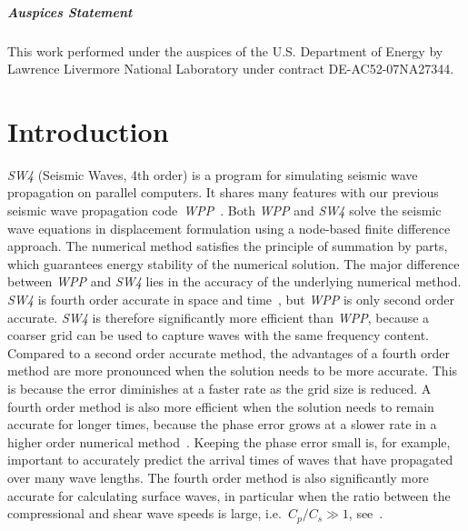 \documentclass[11pt]{report}
\begin{document}
\paragraph{Auspices Statement}
This work performed under the auspices of the U.S. Department of Energy by Lawrence Livermore
National Laboratory under contract DE-AC52-07NA27344.
\tableofcontents


\chapter{Introduction}


\emph{SW4} (Seismic Waves, 4th order) is a program for simulating seismic wave propagation on
parallel computers. It shares many features with our previous seismic wave propagation
code~\emph{WPP}~\cite{WPP2}. Both \emph{WPP} and \emph{SW4} solve the seismic wave equations in
displacement formulation using a node-based finite difference approach. The numerical method
satisfies the principle of summation by parts, which guarantees energy stability of the numerical
solution. The major difference between \emph{WPP} and \emph{SW4} lies in the accuracy of the
underlying numerical method. \emph{SW4} is fourth order accurate in space and time~\cite{SjoPet-12},
but \emph{WPP} is only second order accurate. \emph{SW4} is therefore significantly more efficient
than \emph{WPP}, because a coarser grid can be used to capture waves with the same frequency
content. Compared to a second order accurate method, the advantages of a fourth order method are
more pronounced when the solution needs to be more accurate. This is because the error diminishes at
a faster rate as the grid size is reduced. A fourth order method is also more efficient when the
solution needs to remain accurate for longer times, because the phase error grows at a slower rate
in a higher order numerical method~\cite{Gustafsson-Kreiss-Oliger}. Keeping the phase error small
is, for example, important to accurately predict the arrival times of waves that have propagated
over many wave lengths. The fourth order method is also significantly more accurate for calculating
surface waves, in particular when the ratio between the compressional and shear wave speeds is
large, i.e.~$C_p/C_s\gg 1$, see~\cite{KrePet-12}.

\end{document}
